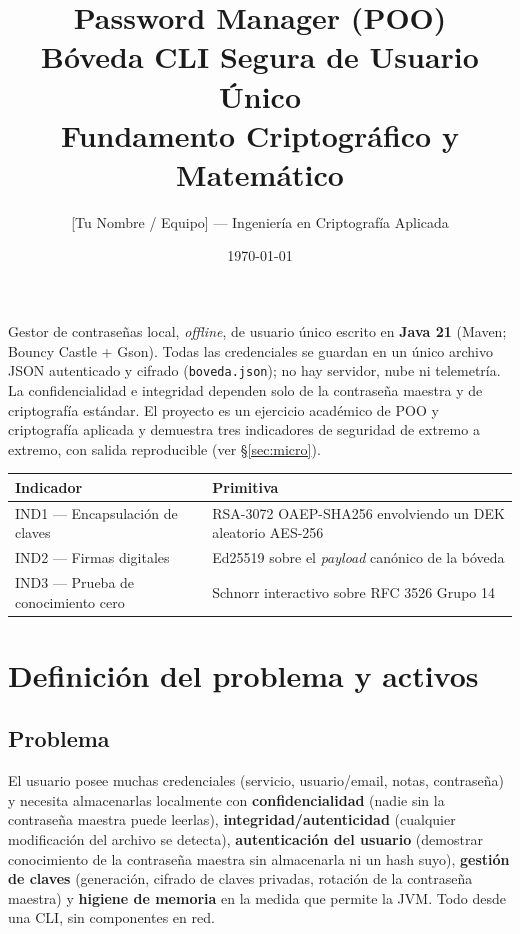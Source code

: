 \documentclass[11pt,a4paper]{article}
\title{Password Manager (POO)\\[0.3em]\large Bóveda CLI Segura de Usuario Único\\Fundamento Criptográfico y Matemático}
\author{[Tu Nombre / Equipo] --- Ingeniería en Criptografía Aplicada}
\date{\today}
\begin{document}
\maketitle
\tableofcontents
\bigskip

\noindent
Gestor de contraseñas local, \emph{offline}, de usuario único escrito en
\textbf{Java 21} (Maven; Bouncy Castle + Gson). Todas las credenciales se guardan
en un único archivo JSON autenticado y cifrado (\texttt{boveda.json}); no hay
servidor, nube ni telemetría. La confidencialidad e integridad dependen solo de la
contraseña maestra y de criptografía estándar. El proyecto es un ejercicio
académico de POO y criptografía aplicada y demuestra tres indicadores de seguridad
de extremo a extremo, con salida reproducible (ver §\ref{sec:micro}).

\begin{center}
\begin{tabular}{@{}ll@{}}
\toprule
Indicador & Primitiva \\
\midrule
IND1 --- Encapsulación de claves & RSA-3072 OAEP-SHA256 envolviendo un DEK aleatorio AES-256 \\
IND2 --- Firmas digitales        & Ed25519 sobre el \emph{payload} canónico de la bóveda \\
IND3 --- Prueba de conocimiento cero & Schnorr interactivo sobre RFC 3526 Grupo 14 \\
\bottomrule
\end{tabular}
\end{center}

\section{Definición del problema y activos}

\subsection{Problema}
El usuario posee muchas credenciales (servicio, usuario/email, notas, contraseña)
y necesita almacenarlas localmente con \textbf{confidencialidad} (nadie sin la
contraseña maestra puede leerlas), \textbf{integridad/autenticidad} (cualquier
modificación del archivo se detecta), \textbf{autenticación del usuario}
(demostrar conocimiento de la contraseña maestra sin almacenarla ni un hash
suyo), \textbf{gestión de claves} (generación, cifrado de claves privadas,
rotación de la contraseña maestra) y \textbf{higiene de memoria} en la medida que
permite la JVM. Todo desde una CLI, sin componentes en red.
\end{document}
